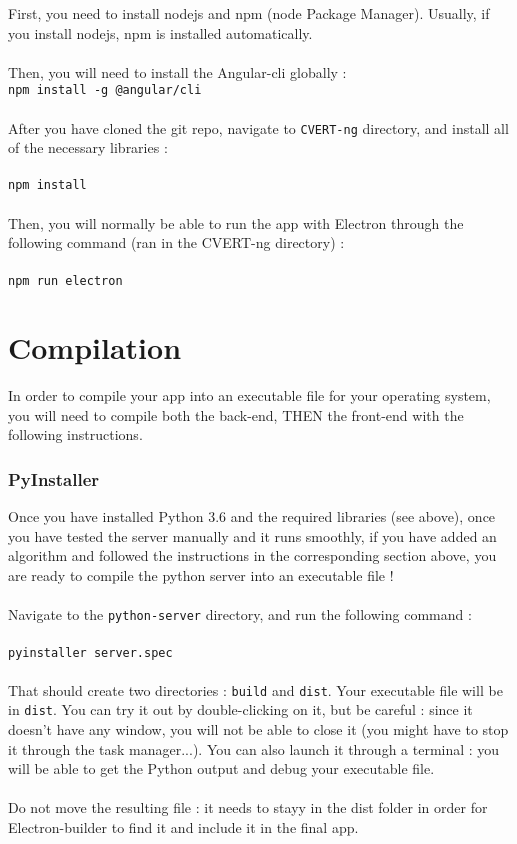 \documentclass[12pt,a4paper]{article}
\begin{document}
First, you need to install nodejs and npm (node Package Manager). Usually, if you install nodejs, npm is installed automatically.\\
~\\
Then, you will need to install the Angular-cli globally :\\
\texttt{npm install -g @angular/cli}\\
~\\
After you have cloned the git repo, navigate to \texttt{CVERT-ng} directory, and install all of the necessary libraries :\\
~\\
\texttt{npm install}\\
~\\
Then, you will normally be able to run the app with Electron through the following command (ran in the CVERT-ng directory) :\\
~\\
\texttt{npm run electron}

\pagebreak

\part{Compilation}
\setcounter{section}{0}

In order to compile your app into an executable file for your operating system, you will need to compile both the back-end, THEN the front-end with the following instructions.

\section{PyInstaller}

Once you have installed Python 3.6 and the required libraries (see above), once you have tested the server manually and it runs smoothly, if you have added an algorithm and followed the instructions in the corresponding section above, you are ready to compile the python server into an executable file !\\
~\\
Navigate to the \texttt{python-server} directory, and run the following command :\\
~\\
\texttt{pyinstaller server.spec}\\
~\\
That should create two directories : \texttt{build} and \texttt{dist}. Your executable file will be in \texttt{dist}. You can try it out by double-clicking on it, but be careful : since it doesn't have any window, you will not be able to close it (you might have to stop it through the task manager...). You can also launch it through a terminal : you will be able to get the Python output and debug your executable file.\\
~\\
Do not move the resulting file : it needs to stayy in the dist folder in order for Electron-builder to find it and include it in the final app.
\end{document}
